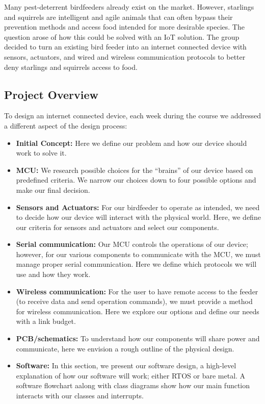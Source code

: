 \documentclass[12pt,a4paper]{article}
\begin{document}
Many pest-deterrent birdfeeders already exist on the market. However, starlings and squirrels are intelligent and agile animals that can often bypass their prevention methods and access food intended for more desirable species. The question arose of how this could be solved with an IoT solution. The group decided to turn an existing bird feeder into an internet connected device with sensors, actuators, and wired and wireless communication protocols to better deny starlings and squirrels access to food. 
\subsection{Project Overview}
To design an internet connected device, each week during the course we addressed a different aspect of the design process: 
\begin{itemize}
    \item \textbf{Initial Concept:} Here we define our problem and how our device should work to solve it.
    \item \textbf{MCU:} We research possible choices for the “brains” of our device based on predefined criteria. We narrow our choices down to four possible options and make our final decision.
    \item \textbf{Sensors and Actuators:} For our birdfeeder to operate as intended, we need to decide how our device will interact with the physical world. Here, we define our criteria for sensors and actuators and select our components.
    \item \textbf{Serial communication:} Our MCU controls the operations of our device; however, for our various components to communicate with the MCU, we must manage proper serial communication. Here we define which protocols we will use and how they work.
    \item \textbf{Wireless communication:} For the user to have remote access to the feeder (to receive data and send operation commands), we must provide a method for wireless communication. Here we explore our options and define our needs with a link budget.
    \item \textbf{PCB/schematics:} To understand how our components will share power and communicate, here we envision a rough outline of the physical design.
    \item \textbf{Software:} In this section, we present our software design, a high-level explanation of how our software will work; either RTOS or bare metal. A software flowchart aalong with class diagrams show how our main function interacts with our classes and interrupts.
\end{itemize}
\end{document}
